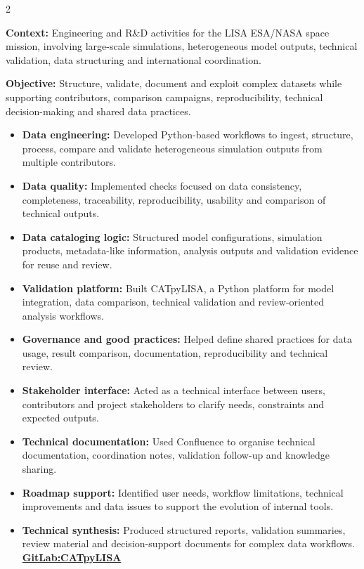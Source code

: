 \documentclass[8pt,a4paper,ragged2e,withhyper]{altacv}
\begin{document}
\begin{paracol}{2}
\divider


\textbf{Context:} Engineering and R\&D activities for the LISA ESA/NASA space mission, involving large-scale simulations, heterogeneous model outputs, technical validation, data structuring and international coordination.

\textbf{Objective:} Structure, validate, document and exploit complex datasets while supporting contributors, comparison campaigns, reproducibility, technical decision-making and shared data practices.

\begin{itemize}
  \item \textbf{Data engineering:} Developed Python-based workflows to ingest, structure, process, compare and validate heterogeneous simulation outputs from multiple contributors.
  \item \textbf{Data quality:} Implemented checks focused on data consistency, completeness, traceability, reproducibility, usability and comparison of technical outputs.
  \item \textbf{Data cataloging logic:} Structured model configurations, simulation products, metadata-like information, analysis outputs and validation evidence for reuse and review.
  \item \textbf{Validation platform:} Built CATpyLISA, a Python platform for model integration, data comparison, technical validation and review-oriented analysis workflows.
  \item \textbf{Governance and good practices:} Helped define shared practices for data usage, result comparison, documentation, reproducibility and technical review.
  \item \textbf{Stakeholder interface:} Acted as a technical interface between users, contributors and project stakeholders to clarify needs, constraints and expected outputs.
  \item \textbf{Technical documentation:} Used Confluence to organise technical documentation, coordination notes, validation follow-up and knowledge sharing.
  \item \textbf{Roadmap support:} Identified user needs, workflow limitations, technical improvements and data issues to support the evolution of internal tools.
  \item \textbf{Technical synthesis:} Produced structured reports, validation summaries, review material and decision-support documents for complex data workflows.
  \textcolor{DarkPastelRed}{\href{https://gitlab.oca.eu/gboileau/lisa_l3_tools}{\bf GitLab:CATpyLISA}}
\end{itemize}


\end{paracol}
\end{document}
